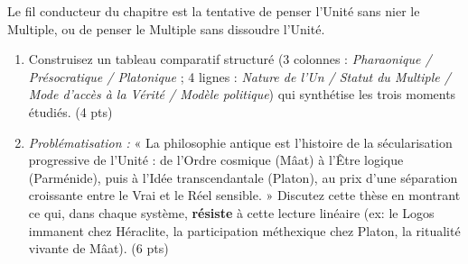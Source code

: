 \documentclass[11pt]{article}
\begin{document}
\begin{exercice}
Le fil conducteur du chapitre est la tentative de penser l'Unité sans nier le Multiple, ou de penser le Multiple sans dissoudre l'Unité.

\begin{enumerate}
    \item Construisez un tableau comparatif structuré (3 colonnes : \textit{Pharaonique / Présocratique / Platonique} ; 4 lignes : \textit{Nature de l'Un / Statut du Multiple / Mode d'accès à la Vérité / Modèle politique}) qui synthétise les trois moments étudiés. (4 pts)
    \item \textit{Problématisation :} « La philosophie antique est l'histoire de la sécularisation progressive de l'Unité : de l'Ordre cosmique (Mâat) à l'Être logique (Parménide), puis à l'Idée transcendantale (Platon), au prix d'une séparation croissante entre le Vrai et le Réel sensible. » Discutez cette thèse en montrant ce qui, dans chaque système, \textbf{résiste} à cette lecture linéaire (ex: le Logos immanent chez Héraclite, la participation méthexique chez Platon, la ritualité vivante de Mâat). (6 pts)
\end{enumerate}
\end{exercice}
\end{document}
